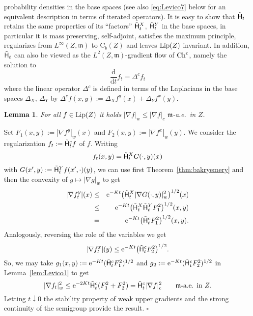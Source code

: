 \documentclass[reqno,11pt]{article}
\numberwithin{equation}{section}
\newcommand{\C}{\mathbb{C}}
\newcommand{\mm}{{\mbox{\boldmath$m$}}}
\newcommand{\rme}{{\mathrm e}}
\renewcommand{\d}{{\mathrm d}}
\newenvironment{proof}{\removelastskip\par\medskip   %
\noindent{\em Proof.}
\rm}{\penalty-20\null\hfill$\square$\par\medbreak}
\newtheorem{lemma}[theorem]{Lemma}
\newcommand{\weakgrad}[1]{|\nabla #1|_w}                %
\newcommand{\cartgrad}[1]{|\nabla #1|_c}
\renewcommand{\C}{{\rm Ch}}
\newcommand{\heatl}{{\sf H}}
\newcommand{\Deltamc}{\Delta^c}
\newcommand{\Cb}{\mathrm C_b}
\renewcommand{\mm}{\mathfrak m}
\begin{document}
probability densities in the base spaces (see also
\eqref{eq:Levico7} below for an equivalent description in terms of
iterated operators). It is easy to show that $\tilde\heatl_t$
retains the same properties of its ``factors'' $\tilde\heatl_t^X$,
$\tilde\heatl_t^Y$ in the base spaces, in particular it is mass
preserving, self-adjoint, satisfies the maximum principle,
regularizes from $L^\infty(Z,\mm)$ to $\Cb(Z)$ and leaves ${\rm
Lip}(Z)$ invariant. In addition, $\tilde\heatl_t$ can also be viewed
as the $L^2(Z,\mm)$-gradient flow of $\C^c$, namely the solution to
\begin{equation}\label{eq:Prato2}
\frac{\d}{\d t}f_t=\Deltamc f_t
\end{equation}
where the linear operator $\Deltamc$ is defined in terms of the
Laplacians in the base spaces $\Delta_X$, $\Delta_Y$ by $\Deltamc
f(x,y):=\Delta_X f^y(x)+\Delta_Y f^x(y)$.

\begin{lemma}\label{lem:Levico2}
For all $f\in{\rm Lip}(Z)$ it holds $\weakgrad{f}\leq\cartgrad{f}$
$\mm$-a.e.~in $Z$.
\end{lemma}
\begin{proof} Set $F_1(x,y):=\weakgrad{f^y}(x)$ and
$F_2(x,y):=\weakgrad{f^x}(y)$. We consider the regularization
$f_t:=\tilde\heatl^c_t f$ of $f$. Writing
\begin{equation}\label{eq:Levico7}
f_t(x,y)=\tilde\heatl_t^X G(\cdot,y)(x)
\end{equation}
with $G(x',y):=\tilde\heatl_t^Y f(x',\cdot)(y)$, we can use first
Theorem~\ref{thm:bakryemery} and then the convexity of
$g\mapsto\weakgrad{g}$ to get
\begin{eqnarray*}
|\nabla f_t^y|(x)&\leq&
\rme^{-Kt}\bigl(\tilde\heatl_t^X\weakgrad{G(\cdot,y)}^2\bigr)^{1/2}(x)
\\&\leq&
\rme^{-Kt}\bigl(\tilde\heatl_t^X\tilde\heatl_t^YF_1^2\bigr)^{1/2}(x,y)\\
&=&\rme^{-Kt}\bigl(\tilde\heatl^c_t F_1^2\bigr)^{1/2}(x,y).
\end{eqnarray*}
Analogously, reversing the role of the variables we get
$$
|\nabla f_t^x|(y)\leq \rme^{-Kt}\bigl(\tilde\heatl^c_t
F_2^2\bigr)^{1/2}.
$$
So, we may take $g_1(x,y):=\rme^{-Kt}(\tilde\heatl_t^c F_1^2)^{1/2}$
and $g_2:=\rme^{-Kt}(\tilde\heatl_t^c F_2^2)^{1/2}$ in
Lemma~\ref{lem:Levico1} to get
$$
\weakgrad{f_t}^2\leq \rme^{-2Kt}\tilde\heatl_t^c
(F_1^2+F_2^2)=\tilde\heatl_t^c\cartgrad{f}^2 \qquad\text{$\mm$-a.e.
in $Z$.}
$$
Letting $t\downarrow 0$ the stability property of weak upper
gradients and the strong continuity of the semigroup provide the
result.
\end{proof}
\end{document}
